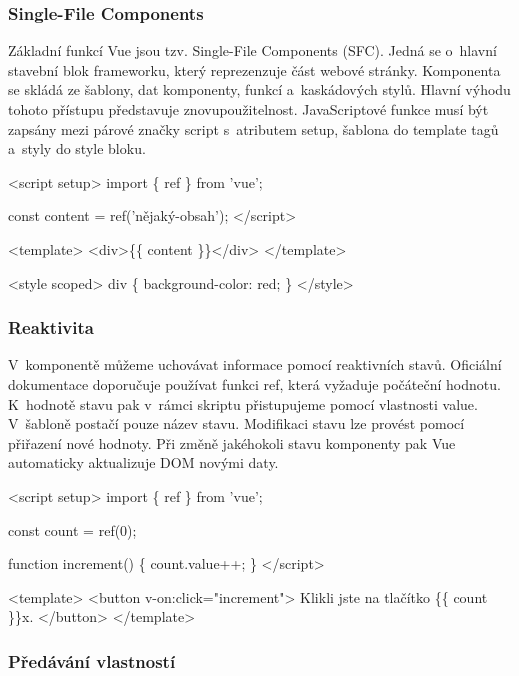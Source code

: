 \subsubsection{Single-File Components}

Základní funkcí Vue jsou tzv. Single-File Components (SFC). Jedná se o~hlavní stavební blok frameworku, který reprezenzuje část webové stránky. 
Komponenta se skládá ze šablony, dat komponenty, funkcí a~kaskádových stylů. Hlavní výhodu tohoto přístupu představuje znovupoužitelnost. 
JavaScriptové funkce musí být zapsány mezi párové značky script s~atributem setup, šablona do template tagů a~styly do style bloku.\cite{vuemacrae,vue}

\begin{prog}
<script setup>
  import \{ ref \} from 'vue';
  
  const content = ref('nějaký-obsah');
</script>
  
<template>
  <div>\{\{ content \}\}</div>
</template>
  
<style scoped>
  div \{
    background-color: red;
  \}
</style>
\end{prog}

\subsubsection{Reaktivita}

V~komponentě můžeme uchovávat informace pomocí reaktivních stavů. Oficiální dokumentace doporučuje používat funkci ref, která vyžaduje počáteční hodnotu. 
K~hodnotě stavu pak v~rámci skriptu přistupujeme pomocí vlastnosti value. V~šabloně postačí pouze název stavu. 
Modifikaci stavu lze provést pomocí přiřazení nové hodnoty. Při změně jakéhokoli stavu komponenty pak Vue automaticky aktualizuje DOM novými daty.\cite{vue}

\begin{prog}
<script setup>
  import \{ ref \} from 'vue';
  
  const count = ref(0);

  function increment() \{
    count.value++;
  \}
</script>
  
<template>
  <button v-on:click="increment">
    Klikli jste na tlačítko \{\{ count \}\}x.
  </button>
</template>
\end{prog}

\subsubsection{Předávání vlastností}

